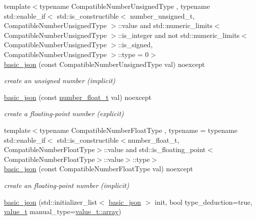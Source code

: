 \begin{DoxyCompactItemize}
{\footnotesize template$<$typename Compatible\+Number\+Unsigned\+Type , typename std\+::enable\+\_\+if$<$                                                              std\+::is\+\_\+constructible$<$ number\+\_\+unsigned\+\_\+t, Compatible\+Number\+Unsigned\+Type $>$\+::value and                                                           std\+::numeric\+\_\+limits$<$ Compatible\+Number\+Unsigned\+Type $>$\+::is\+\_\+integer and                                                           not std\+::numeric\+\_\+limits$<$ Compatible\+Number\+Unsigned\+Type $>$\+::is\+\_\+signed,                                                           Compatible\+Number\+Unsigned\+Type $>$\+::type  = 0$>$ }\\\hyperlink{classnlohmann_1_1basic__json_a68a5f34b164a07b8ced13fcf2b7ec834}{basic\+\_\+json} (const Compatible\+Number\+Unsigned\+Type val) noexcept
\begin{DoxyCompactList}\small\item\em create an unsigned number (implicit) \end{DoxyCompactList}\item 
\hyperlink{classnlohmann_1_1basic__json_a2badcf191deabf579abcf8d3654da26f}{basic\+\_\+json} (const \hyperlink{classnlohmann_1_1basic__json_a74a0013e847fdc574b48f931f0e757e1}{number\+\_\+float\+\_\+t} val) noexcept
\begin{DoxyCompactList}\small\item\em create a floating-\/point number (explicit) \end{DoxyCompactList}\item 
{\footnotesize template$<$typename Compatible\+Number\+Float\+Type , typename  = typename std\+::enable\+\_\+if$<$                 std\+::is\+\_\+constructible$<$number\+\_\+float\+\_\+t, Compatible\+Number\+Float\+Type$>$\+::value and                 std\+::is\+\_\+floating\+\_\+point$<$\+Compatible\+Number\+Float\+Type$>$\+::value$>$\+::type$>$ }\\\hyperlink{classnlohmann_1_1basic__json_a4bbdfd6dd8d2e6fc9ac5d81ef61ba3fe}{basic\+\_\+json} (const Compatible\+Number\+Float\+Type val) noexcept
\begin{DoxyCompactList}\small\item\em create an floating-\/point number (implicit) \end{DoxyCompactList}\item 
\hyperlink{classnlohmann_1_1basic__json_afeb998aec45296bc2050bd1c41ef41eb}{basic\+\_\+json} (std\+::initializer\+\_\+list$<$ \hyperlink{classnlohmann_1_1basic__json}{basic\+\_\+json} $>$ init, bool type\+\_\+deduction=true, \hyperlink{classnlohmann_1_1basic__json_a231b02148577b69a154b2ce2c87a5522}{value\+\_\+t} manual\+\_\+type=\hyperlink{classnlohmann_1_1basic__json_a231b02148577b69a154b2ce2c87a5522af1f713c9e000f5d3f280adbd124df4f5}{value\+\_\+t\+::array})

\end{DoxyCompactItemize}

